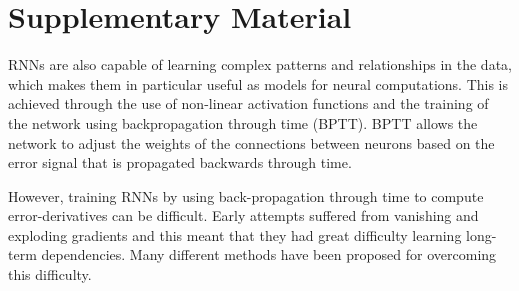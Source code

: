 \documentclass{article}
\newcounter{ct}
\theoremstyle{definition}
\theoremstyle{remark}
\begin{document}
\small

\newpage



\newpage
\section{Supplementary Material}

RNNs are also capable of learning complex patterns and relationships in the data, which makes them in particular useful as models for neural computations. This is achieved through the use of non-linear activation functions and the training of the network using backpropagation through time (BPTT).
BPTT allows the network to adjust the weights of the connections between neurons based on the error signal that is propagated backwards through time. 

However, training RNNs by using back-propagation through time to compute error-derivatives can be difficult.  Early attempts suffered from vanishing and exploding gradients \citep{kolenGradientFlowRecurrent2009} and this meant that they had great difficulty learning long-term dependencies. 
Many different methods have been proposed for overcoming this difficulty.
\end{document}
